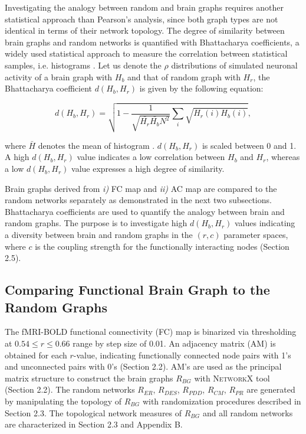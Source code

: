Investigating the analogy between random and brain graphs requires another statistical approach than Pearson's analysis, since both graph types are not identical in terms of their network topology. The degree of similarity between brain graphs and random networks is quantified with 
Bhattacharya coefficients, a widely used statistical approach to measure the correlation between statistical samples, i.e. histograms \citep{XYZ43}. Let us denote the $\rho$ distributions of simulated neuronal activity of a brain graph with $H_b$ and that of random graph with $H_r$, the Bhattacharya coefficient $d(H_b, H_r)$ is given by the following equation:

\begin{equation}
d(H_b, H_r) = \sqrt{1- \dfrac{1}{ \sqrt{\bar{H_r} \bar{H_b} N^2}} \sum_{i} \sqrt{H_r(i)H_b(i)} } ,
\end{equation}

where $\bar{H}$ denotes the mean of histogram \citep{XYZ43}. $d(H_b, H_r)$ is scaled between 0 and 1. A high $d(H_b, H_r)$ value indicates a low correlation between $H_b$ and $H_r$, whereas a low   $d(H_b, H_r)$ value expresses a high degree of similarity. 

Brain graphs derived from \textit{i)} FC map and \textit{ii)} AC map are compared to the random networks separately as demonstrated in the next two subsections. Bhattacharya coefficients are used to quantify the analogy between brain and random graphs. The purpose is to investigate high $d(H_b, H_r)$ values indicating a diversity between brain and random graphs in the $(r,c)$ parameter spaces, where $c$ is the coupling strength for the functionally interacting nodes (Section 2.5).    


\subsection{Comparing Functional Brain Graph to the Random Graphs}

The fMRI-BOLD functional connectivity (FC) map is binarized via thresholding at $0.54 \leq r \leq 0.66$ range by step size of 0.01. An adjacency matrix (AM) is obtained for each $r$-value, indicating functionally connected node pairs with 1's and unconnected pairs with 0's (Section 2.2). AM's are used as the principal matrix structure to construct the brain graphs $R_{BG}$ with \textsc{NetworkX} tool (Section 2.2). The random networks $R_{ER}$, $R_{DES}$, $R_{PDD}$, $R_{CM}$, $R_{PR}$ are generated by manipulating the topology of $R_{BG}$ with randomization procedures described in Section 2.3. The topological network measures of $R_{BG}$ and all random networks are characterized in Section 2.3 and Appendix B. 

